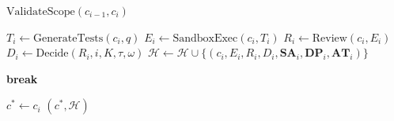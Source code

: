 \begin{algorithm}[htbp]
\begin{algorithmic}[1]
        \STATE $\text{ValidateScope}(c_{i-1}, c_i)$
    \ENDIF

    \STATE {}
    \STATE $T_i \leftarrow \text{GenerateTests}(c_i, q)$
    \STATE $E_i \leftarrow \text{SandboxExec}(c_i, T_i)$
    \STATE $R_i \leftarrow \text{Review}(c_i, E_i)$
    \STATE $D_i \leftarrow \text{Decide}(R_i, i, K, \tau, \omega)$
    \STATE $\mathcal{H} \leftarrow \mathcal{H} \cup \{(c_i, E_i, R_i, D_i, \mathbf{SA}_i, \mathbf{DP}_i, \mathbf{AT}_i)\}$

        \STATE \textbf{break}
    \ENDIF

\ENDFOR

\STATE $c^{*} \leftarrow c_i$
\RETURN $(c^{*}, \mathcal{H})$

\end{algorithmic}
\end{algorithm}



